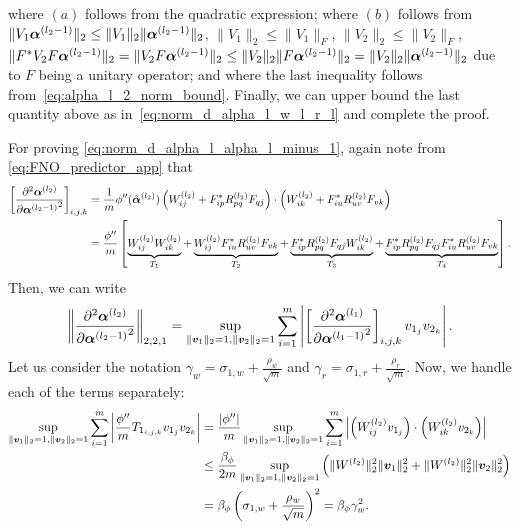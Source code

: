     where $(a)$ follows from the quadratic expression; where $(b)$ follows from $\|V_1\boldsymbol{\alpha}^{(l_2 - 1)}\|_{2} \leq \|V_1\|_2 \| \boldsymbol{\alpha}^{(l_2 - 1)}\|_2$, $\|V_1\|_2 \leq \|V_1\|_F$, $\|V_2\|_2 \leq \|V_2\|_F$,  
    $\|F^*V_2F\boldsymbol{\alpha}^{(l_2 - 1)}\|_{2} =\| V_2F \boldsymbol{\alpha}^{(l_2 - 1)} \|_2 \leq \|V_2\|_2 \| F\boldsymbol{\alpha}^{(l_2 - 1)}\|_2= \|V_2\|_2 \| \boldsymbol{\alpha}^{(l_2 - 1)}\|_2$ due to $F$ being a unitary operator; and where the last inequality follows from~\eqref{eq:alpha_l_2_norm_bound}. Finally, we can upper bound the last quantity above as in~\eqref{eq:norm_d_alpha_l_w_l_r_l} and complete the proof.

    For proving \eqref{eq:norm_d_alpha_l_alpha_l_minus_1}, again note from \eqref{eq:FNO_predictor_app} that
    \begin{align}
            \begin{aligned}
            \left[ {\frac{\partial^2 \boldsymbol{\alpha}^{(l_2)}}{\partial {\boldsymbol{\alpha}^{(l_2-1)}}^2}} \right]_{i,j,k} 
            &= \frac{1}{m}
            \phi''(\tilde{\boldsymbol{\alpha}}^{(l_2)}) \left( 
                W^{(l_2)}_{ij} + F^*_{ip}R^{(l_2)}_{pq}F_{qj}
            \right) \cdot \left(W^{(l_2)}_{ik} + F^*_{iu}R^{(l_2)}_{uv}F_{vk} \right) \\
            &= \frac{\phi''}{m} \left[ \underbrace{W^{(l_2)}_{ij} W^{(l_2)}_{ik}}_{T_1} + \underbrace{W^{(l_2)}_{ij}F^{*}_{iu}R^{(l_2)}_{uv}F_{vk}}_{T_2} + \underbrace{F^*_{ip}R^{(l_2)}_{pq}F_{qj}W^{(l_2)}_{ik}}_{T_3} +  \underbrace{F^*_{ip}R^{(l_2)}_{pq}F_{qj} F^{*}_{iu}R^{(l_2)}_{uv}F_{vk}}_{T_4} \right].
            \end{aligned}
    \end{align}
    Then, we can write
    \begin{align*}
        \left\| {\frac{\partial^2 \boldsymbol{\alpha}^{(l_2)}}{\partial {\boldsymbol{\alpha}^{(l_2-1)}}^2}}  \right\|_{2,2,1}=
        \sup_{\|{\bm{v}}_1\|_2 = 1,\|{\bm{v}}_2\|_2 = 1} 
        \sum_{i=1}^m\left| \left[ 
            {\frac{\partial^2 \boldsymbol{\alpha}^{(l_1 )}}{\partial {\boldsymbol{\alpha}^{(l_1 - 1)}}^2}}
        \right]_{i,j,k}v_{1_j}v_{2_k}\right|.
    \end{align*}
    Let us consider the notation $\gamma_w = \sigma_{1,w}+\frac{\rho_w}{\sqrt{m}}$ and $\gamma_r = \sigma_{1,r}+\frac{\rho_r}{\sqrt{m}}$.
    Now, we handle each of the terms separately:
    \begin{align}
    \label{eq:T1_norm_d2_alpha2_dalpha2}
        \begin{aligned}
            \sup_{\|{\bm{v}}_1\|_2 = 1,\|{\bm{v}}_2\|_2 = 1} \sum_{i=1}^m \left|\frac{\phi''}{m}T_{1_{i,j,k}}v_{1_j}v_{2_k}\right| 
            &= \frac{|\phi''|}{m} \sup_{\|{\bm{v}}_1\|_2 = 1,\|{\bm{v}}_2\|_2 = 1} \sum_{i=1}^m
            \left|\left( W^{(l_2)}_{ij} v_{1_j}\right)\cdot \left( W^{(l_2)}_{ik} v_{2_k}\right)\right|\\
            &\leq \frac{\beta_{\phi}}{2m}\sup_{\|{\bm{v}}_1\|_2 = 1,\|{\bm{v}}_2\|_2 = 1}\left(\|W^{(l_2)}\|_2^2 \|{\bm{v}}_1\|_2^2 + \|W^{(l_2)}\|_2^2 \|{\bm{v}}_2\|_2^2 \right) \\
            &=\beta_{\phi}\left( \sigma_{1,w} + \frac{\rho_w}{\sqrt{m}}\right)^2 = \beta_{\phi} \gamma_w^2.
        \end{aligned}
    \end{align}
